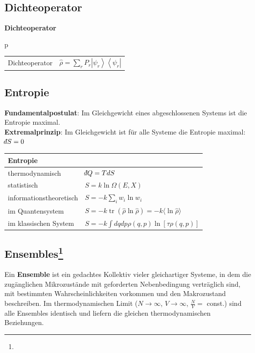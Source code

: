\documentclass[12pt,a4paper, twoside]{article}
\makeatletter
\DeclareMathOperator{\tr}{tr}
\newcommand{\ket}[1]{\left| #1 \right>}
\newcommand{\bra}[1]{\left< #1 \right|}
\renewcommand{\=}[1]{\stackrel{#1}{=}}
\def\dbar{{\mathchar'26\mkern-12mu d}}
\def\dbar{{\mathchar'26\mkern-12mu d}}
\theoremstyle{definition}
\theoremstyle{remark}
\newcommand{\concept}[2]{%
\noindent
\begin{framed}
\noindent\textbf{#1}
\par\begin{tabular}{p{\linewidth}}
#2
\end{tabular}
\end{framed}
}
\newcommand{\f}[2]{%
\noindent\begin{tabularx}{\linewidth}{@{}p{5cm}X}
#1 & $#2$
\end{tabularx}}
\makeatother
\begin{document}
\subsection{Dichteoperator}

\concept{Dichteoperator}{
\f{Dichteoperator}{\hat \rho = \sum_r P_r \ket{\psi_r}\bra{\psi_r}}
}

\subsection{Entropie}

\textbf{Fundamentalpostulat}: Im Gleichgewicht eines abgeschlossenen Systems ist die Entropie maximal.\\
\textbf{Extremalprinzip}: Im Gleichgewicht ist für alle Systeme die Entropie maximal: $\dbar S = 0$

\begin{center}
\begin{framed}
	\begin{tabular}{ll}
	Entropie & \\
	\midrule
	thermodynamisch & $\dbar Q = T dS$\\
	statistisch & $S = k \ln \Omega(E, X)$\\
	informationstheoretisch & $S = - k \sum_i w_i \ln w_i$\\
	\midrule
	im Quantensystem & $S = -k \tr(\hat \rho \ln \hat \rho) = -k \langle \ln \hat \rho \rangle$\\
	im klassischen System & $S = -k \int dq dp \rho(q, p) \ln [\tau \rho(q, p)]$\\
	\bottomrule
	\end{tabular}
\end{framed}
\end{center}

\subsection[Ensembles]{Ensembles\let\thefootnote\relax\footnote{}}

Ein \textbf{Ensemble} ist ein gedachtes Kollektiv vieler gleichartiger Systeme, in dem die zugänglichen Mikrozustände mit geforderten Nebenbedingung verträglich sind, mit bestimmten Wahrscheinlichkeiten vorkommen und den Makrozustand beschreiben. Im thermodynamischen Limit ($N \longrightarrow \infty$, $V \longrightarrow \infty$, $\frac{N}{V} = $ const.) sind alle Ensembles identisch und liefern die gleichen thermodynamischen Beziehungen.\\
\end{document}
